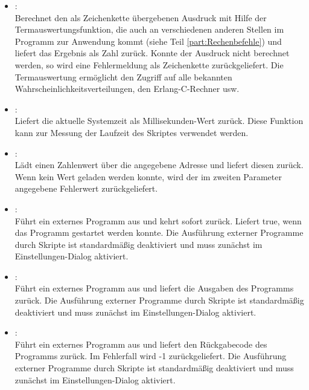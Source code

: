 \begin{itemize}

\item
{}:\\
Berechnet den als Zeichenkette übergebenen Ausdruck mit Hilfe der Termauswertungsfunktion, die
auch an verschiedenen anderen Stellen im Programm zur Anwendung kommt (siehe Teil \ref{part:Rechenbefehle})	
und liefert das Ergebnis   als Zahl zurück. Konnte der Ausdruck nicht berechnet werden, so wird eine Fehlermeldung als
Zeichenkette zurückgeliefert. Die Termauswertung ermöglicht den Zugriff auf alle bekannten
Wahrscheinlichkeitsverteilungen, den Erlang-C-Rechner usw.

\item
{}:\\
Liefert die aktuelle Systemzeit als Millisekunden-Wert zurück. Diese Funktion kann zur Messung der
Laufzeit des Skriptes verwendet werden.

\item
{}:\\
Lädt einen Zahlenwert über die angegebene Adresse und liefert diesen zurück.
Wenn kein Wert geladen werden konnte, wird der im zweiten Parameter angegebene
Fehlerwert zurückgeliefert.

\item
{}:\\
Führt ein externes Programm aus und kehrt sofort zurück. Liefert true, wenn das Programm gestartet werden konnte.
Die Ausführung externer Programme durch Skripte ist standardmäßig deaktiviert
und muss zunächst im Einstellungen-Dialog aktiviert.

\item
{}:\\
Führt ein externes Programm aus und liefert die Ausgaben des Programms zurück.
Die Ausführung externer Programme durch Skripte ist standardmäßig deaktiviert
und muss zunächst im Einstellungen-Dialog aktiviert.

\item
{}:\\
Führt ein externes Programm aus und liefert den Rückgabecode des Programms zurück.
Im Fehlerfall wird -1 zurückgeliefert.
Die Ausführung externer Programme durch Skripte ist standardmäßig deaktiviert
und muss zunächst im Einstellungen-Dialog aktiviert.
	
\end{itemize}



